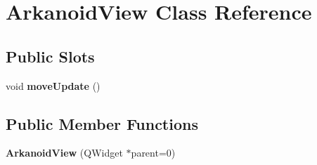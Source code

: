 \hypertarget{classArkanoidView}{\section{\-Arkanoid\-View \-Class \-Reference}
\label{classArkanoidView}
}
\subsection*{\-Public \-Slots}
\begin{DoxyCompactItemize}
\item 
\hypertarget{classArkanoidView_a100ba0118cded14db9dc6fcdd6d82d2c}{void {\bfseries move\-Update} ()}\label{classArkanoidView_a100ba0118cded14db9dc6fcdd6d82d2c}

\end{DoxyCompactItemize}
\subsection*{\-Public \-Member \-Functions}
\begin{DoxyCompactItemize}
\item 
\hypertarget{classArkanoidView_a1c77c361f7102a8f5a7c64bc8c9c394a}{{\bfseries \-Arkanoid\-View} (\-Q\-Widget $\ast$parent=0)}\label{classArkanoidView_a1c77c361f7102a8f5a7c64bc8c9c394a}

\end{DoxyCompactItemize}
